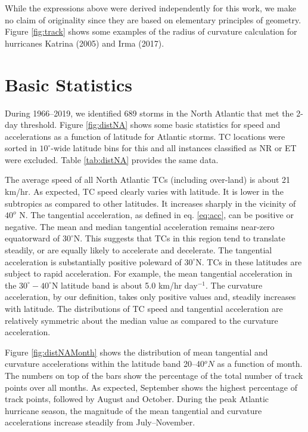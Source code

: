 \documentclass[wcd,manuscript]{copernicus}
\begin{document}
While the expressions above were derived independently for this work, we make no claim of originality since they are based on elementary principles of geometry. Figure \ref{fig:track} shows some examples of the radius of curvature calculation for hurricanes Katrina (2005) and Irma (2017). 

\section{Basic Statistics}

During 1966--2019, we identified 689 storms in the North Atlantic that met the 2-day threshold. Figure \ref{fig:distNA} shows some basic statistics for speed and accelerations as a function of latitude for Atlantic storms. TC locations were sorted in $10^\circ$-wide latitude bins for this and all instances classified as NR or ET were excluded. Table \ref{tab:distNA} provides the same data. 


The average speed of all North Atlantic TCs (including over-land) is about 21 km/hr. As expected, TC speed clearly varies with latitude. It is lower in the subtropics as compared to other latitudes. It increases sharply in the vicinity of $40^{o}$ N. The tangential acceleration, as defined in eq. \ref{eq:acc}, can be positive or negative. The mean and median tangential acceleration remains near-zero equatorward of $30^\circ$N. This suggests that TCs in this region tend to translate steadily, or are equally likely to accelerate and decelerate. The tangential acceleration is substantially positive poleward of $30^\circ$N. TCs in these latitudes are subject to rapid acceleration. For example, the mean tangential acceleration in the $30^\circ-40^\circ$N latitude band is about 5.0  km/hr day$^{-1}$.  The curvature acceleration, by our definition, takes only positive values and, steadily increases with latitude. The distributions of TC speed and tangential acceleration are relatively symmetric about the median value as compared to the curvature acceleration.

Figure \ref{fig:distNAMonth} shows the distribution of mean tangential and curvature accelerations within the latitude band 20--40$^oN$ as a function of month. The numbers on top of the bars show the percentage of the total number of track points over all months. As expected, September shows the highest percentage of track points, followed by August and October. During the peak Atlantic hurricane season, the magnitude of the mean tangential and curvature accelerations increase steadily from July--November. 
\end{document}
